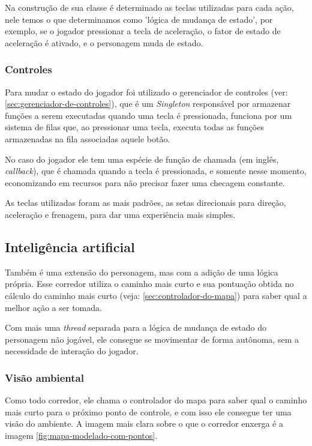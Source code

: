 Na construção de sua classe é determinado as teclas utilizadas para cada ação, nele temos o que determinamos como 'lógica de mudança de estado', por exemplo, se o jogador pressionar a tecla de aceleração, o fator de estado de aceleração é ativado, e o personagem muda de estado.

\subsubsection{Controles}

Para mudar o estado do jogador foi utilizado o gerenciador de controles (ver: \ref{sec:gerenciador-de-controles}), que é um \textit{Singleton} responsável por armazenar funções a serem executadas quando uma tecla é pressionada, funciona por um sistema de filas que, ao pressionar uma tecla, executa todas as funções armazenadas na fila associadas aquele botão.

No caso do jogador ele tem uma espécie de função de chamada (em inglês, \textit{callback}), que é chamada quando a tecla é pressionada, e somente nesse momento, economizando em recursos para não precisar fazer uma checagem constante.

As teclas utilizadas foram as mais padrões, as setas direcionais para direção, aceleração e frenagem, para dar uma experiência mais simples.

\subsection{Inteligência artificial}

Também é uma extensão do personagem, mas com a adição de uma lógica própria. Esse corredor utiliza o caminho mais curto e sua pontuação obtida no cálculo do caminho mais curto (veja: \ref{sec:controlador-do-mapa}) para saber qual a melhor ação a ser tomada.

Com mais uma \textit{thread} separada para a lógica de mudança de estado do personagem não jogável, ele consegue se movimentar de forma autônoma, sem a necessidade de interação do jogador.

\subsubsection{Visão ambiental}

Como todo corredor, ele chama o controlador do mapa para saber qual o caminho mais curto para o próximo ponto de controle, e com isso ele consegue ter uma visão do ambiente. A imagem mais clara sobre o que o corredor enxerga é a imagem \ref{fig:mapa-modelado-com-pontos}.


